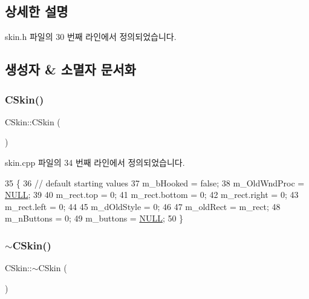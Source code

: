 \subsection{상세한 설명}


skin.\+h 파일의 30 번째 라인에서 정의되었습니다.



\subsection{생성자 \& 소멸자 문서화}
\mbox{\label{class_c_skin_a2126d21d5cb401180163298c61533b87}} 
\subsubsection{\texorpdfstring{C\+Skin()}{CSkin()}}
{\footnotesize\ttfamily C\+Skin\+::\+C\+Skin (\begin{DoxyParamCaption}{ }\end{DoxyParamCaption})}



skin.\+cpp 파일의 34 번째 라인에서 정의되었습니다.


\begin{DoxyCode}
35 \{
36   \textcolor{comment}{// default starting values}
37   m\_bHooked = \textcolor{keyword}{false};
38   m\_OldWndProc = \mbox{\hyperlink{getopt1_8c_a070d2ce7b6bb7e5c05602aa8c308d0c4}{NULL}};
39 
40   m\_rect.top = 0;
41   m\_rect.bottom = 0;
42   m\_rect.right = 0;
43   m\_rect.left = 0;
44 
45   m\_dOldStyle = 0;
46 
47   m\_oldRect = m\_rect;
48   m\_nButtons = 0;
49   m\_buttons = \mbox{\hyperlink{getopt1_8c_a070d2ce7b6bb7e5c05602aa8c308d0c4}{NULL}};
50 \}
\end{DoxyCode}
\mbox{\label{class_c_skin_a206a4d1b135da1869bdf786aba217c2b}} 
\subsubsection{\texorpdfstring{$\sim$\+C\+Skin()}{~CSkin()}}
{\footnotesize\ttfamily C\+Skin\+::$\sim$\+C\+Skin (\begin{DoxyParamCaption}{ }\end{DoxyParamCaption})\hspace{0.3cm}{\ttfamily [virtual]}}



